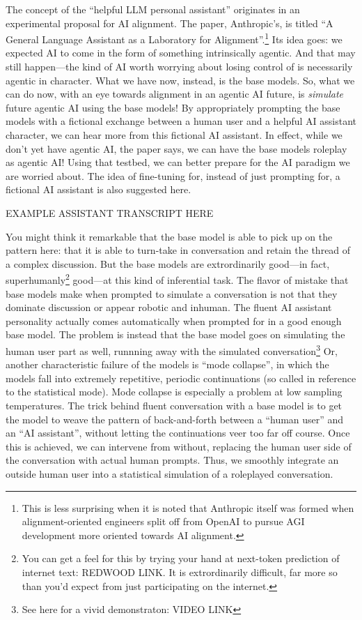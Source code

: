 The concept of the ``helpful LLM personal assistant'' originates in an
experimental proposal for AI alignment. The paper, Anthropic's, is titled ``A
General Language Assistant as a Laboratory for
Alignment''\cite{askell2021assistant}.\footnote{This is less surprising when it
is noted that Anthropic itself was formed when alignment-oriented engineers
split off from OpenAI to pursue AGI development more oriented towards AI
alignment.} Its idea goes: we expected AI to come in the form of something
intrinsically agentic. And that may still happen---the kind of AI worth
worrying about losing control of is necessarily agentic in character. What we
have now, instead, is the base models. So, what we can do now, with an eye
towards alignment in an agentic AI future, is \emph{simulate} future agentic AI
using the base models! By appropriately prompting the base models with a
fictional exchange between a human user and a helpful AI assistant character,
we can hear more from this fictional AI assistant. In effect, while we don't
yet have agentic AI, the paper says, we can have the base models roleplay as
agentic AI! Using that testbed, we can better prepare for the AI paradigm we
are worried about. The idea of fine-tuning for, instead of just prompting for,
a fictional AI assistant is also suggested here.

EXAMPLE ASSISTANT TRANSCRIPT HERE

You might think it remarkable that the base model is able to pick up on the
pattern here: that it is able to turn-take in conversation and retain the
thread of a complex discussion. But the base models are extrordinarily
good---in fact, superhumanly\footnote{You can get a feel for this by trying
your hand at next-token prediction of internet text: REDWOOD LINK. It is
extrordinarily difficult, far more so than you'd expect from just participating
on the internet.} good---at this kind of inferential task. The flavor of
mistake that base models make when prompted to simulate a conversation is not
that they dominate discussion or appear robotic and inhuman. The fluent AI
assistant personality actually comes automatically when prompted for in a good
enough base model. The problem is instead that the base model goes on
simulating the human user part as well, runnning away with the simulated
conversation\footnote{See here for a vivid demonstraton: VIDEO LINK} Or,
another characteristic failure of the models is ``mode collapse'', in which the
models fall into extremely repetitive, periodic continuations (so called in
reference to the statistical mode). Mode collapse is especially a problem at
low sampling temperatures. The trick behind fluent conversation with a base
model is to get the model to weave the pattern of back-and-forth between a
``human user'' and an ``AI assistant'', without letting the continuations veer
too far off course. Once this is achieved, we can intervene from without,
replacing the human user side of the conversation with actual human prompts.
Thus, we smoothly integrate an outside human user into a statistical simulation
of a roleplayed conversation.

